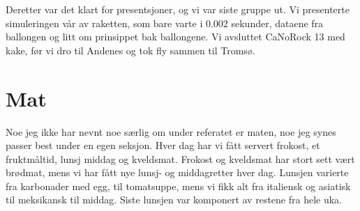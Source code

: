 \documentclass[norsk,a4paper,12pt]{article}
\begin{document}
Deretter var det klart for presentsjoner, og vi var siste gruppe ut. Vi presenterte simuleringen v{\aa}r av raketten, som bare varte i 0.002 sekunder, dataene fra ballongen og litt om prinsippet bak ballongene. Vi avsluttet CaNoRock 13 med kake, f{\o}r vi dro til Andenes og tok fly sammen til Troms{\o}. 

\section*{Mat}
Noe jeg ikke har nevnt noe s{\ae}rlig om under referatet er maten, noe jeg synes passer best under en egen seksjon. Hver dag har vi f{\aa}tt servert frokost, et fruktm{\aa}ltid, lunsj middag og kveldsmat. Frokost og kveldsmat har stort sett v{\ae}rt br{\o}dmat, mens vi har f{\aa}tt nye lunsj- og middagretter hver dag. Lunsjen varierte fra karbonader med egg, til tomatsuppe, mens vi fikk alt fra italiensk og asiatisk til meksikansk til middag. Siste lunsjen var komponert av restene fra hele uka.
\end{document}
